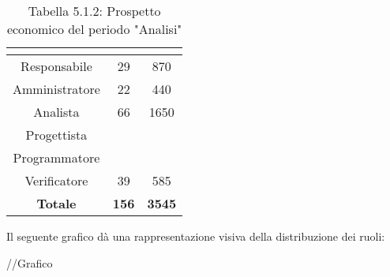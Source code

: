 \renewcommand{\arraystretch}{1.5}
\begin{table}[H]
\begin{center}
\begin{tabular}{|c|c|c|}
\hline
\rowcolor{title_row}
\textbf{\color{title_text}{Ruolo}}  & \textbf{\color{title_text}{Ore}} & \textbf{\color{title_text}{Costo in \euro}} \\ \hline
Responsabile    & 29           & 870                 \\ \hline
Amministratore  & 22           & 440                 \\ \hline
Analista        & 66           & 1650                \\ \hline
Progettista     &              &                     \\ \hline
Programmatore   &              &                     \\ \hline
Verificatore    & 39           & 585                 \\ \hline
\textbf{Totale} & \textbf{156}    & \textbf{3545}    \\ \hline
\end{tabular}
\caption{Tabella 5.1.2: Prospetto economico del periodo "Analisi"\label{}}
\end{center}
\end{table}
\renewcommand{\arraystretch}{1}

Il seguente grafico dà una rappresentazione visiva della distribuzione dei ruoli: \\
\begin{center}
//Grafico
\end{center}

\pagebreak
